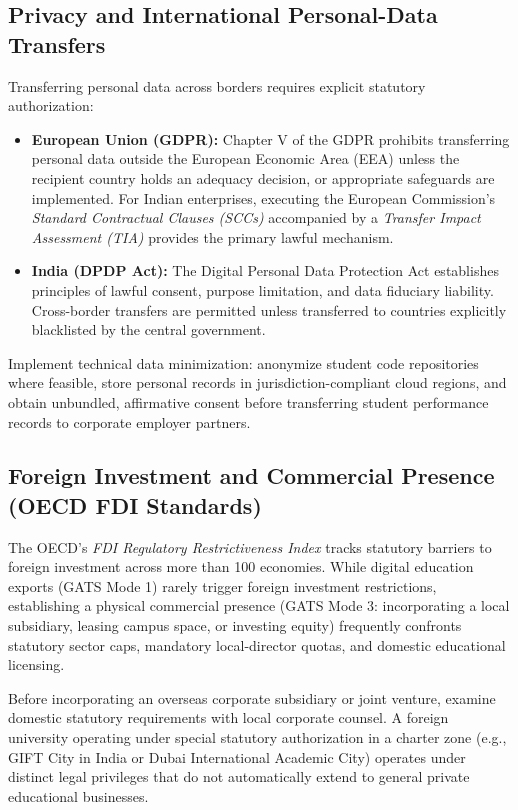 \subsection{Privacy and International Personal-Data Transfers}
\label{sec:gdpr_dpdp_cross_border_data}

Transferring personal data across borders requires explicit statutory authorization:
\begin{itemize}
\item \textbf{European Union (GDPR):} Chapter V of the GDPR prohibits transferring personal data outside the European Economic Area (EEA) unless the recipient country holds an adequacy decision, or appropriate safeguards are implemented. For Indian enterprises, executing the European Commission's \textit{Standard Contractual Clauses (SCCs)} accompanied by a \textit{Transfer Impact Assessment (TIA)} provides the primary lawful mechanism.
\item \textbf{India (DPDP Act):} The Digital Personal Data Protection Act establishes principles of lawful consent, purpose limitation, and data fiduciary liability. Cross-border transfers are permitted unless transferred to countries explicitly blacklisted by the central government.
\end{itemize}
Implement technical data minimization: anonymize student code repositories where feasible, store personal records in jurisdiction-compliant cloud regions, and obtain unbundled, affirmative consent before transferring student performance records to corporate employer partners.

\subsection{Foreign Investment and Commercial Presence (OECD FDI Standards)}
\label{sec:oecd_fdi_standards}

The OECD's \textit{FDI Regulatory Restrictiveness Index} tracks statutory barriers to foreign investment across more than 100 economies. While digital education exports (GATS Mode 1) rarely trigger foreign investment restrictions, establishing a physical commercial presence (GATS Mode 3: incorporating a local subsidiary, leasing campus space, or investing equity) frequently confronts statutory sector caps, mandatory local-director quotas, and domestic educational licensing.

Before incorporating an overseas corporate subsidiary or joint venture, examine domestic statutory requirements with local corporate counsel. A foreign university operating under special statutory authorization in a charter zone (e.g., GIFT City in India or Dubai International Academic City) operates under distinct legal privileges that do not automatically extend to general private educational businesses.

